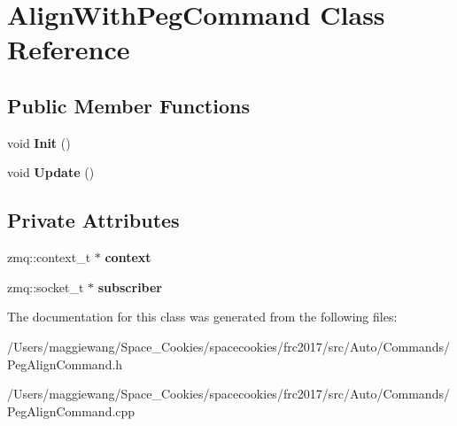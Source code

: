 \hypertarget{class_align_with_peg_command}{}\section{Align\+With\+Peg\+Command Class Reference}
\label{class_align_with_peg_command}
\subsection*{Public Member Functions}
\begin{DoxyCompactItemize}
\item 
\mbox{\label{class_align_with_peg_command_aec3a26a2f33ac872b551f8ae0e69016e}} 
void {\bfseries Init} ()
\item 
\mbox{\label{class_align_with_peg_command_a7ce545b54f2f30bc97c08af81a9e6f0f}} 
void {\bfseries Update} ()
\end{DoxyCompactItemize}
\subsection*{Private Attributes}
\begin{DoxyCompactItemize}
\item 
\mbox{\label{class_align_with_peg_command_ab5096cdc2f80ffc36ebad0f5e0705c00}} 
zmq\+::context\+\_\+t $\ast$ {\bfseries context}
\item 
\mbox{\label{class_align_with_peg_command_aac89315c2267bd36d021467a7ac0d775}} 
zmq\+::socket\+\_\+t $\ast$ {\bfseries subscriber}
\end{DoxyCompactItemize}


The documentation for this class was generated from the following files\+:\begin{DoxyCompactItemize}
\item 
/\+Users/maggiewang/\+Space\+\_\+\+Cookies/spacecookies/frc2017/src/\+Auto/\+Commands/Peg\+Align\+Command.\+h\item 
/\+Users/maggiewang/\+Space\+\_\+\+Cookies/spacecookies/frc2017/src/\+Auto/\+Commands/Peg\+Align\+Command.\+cpp\end{DoxyCompactItemize}
